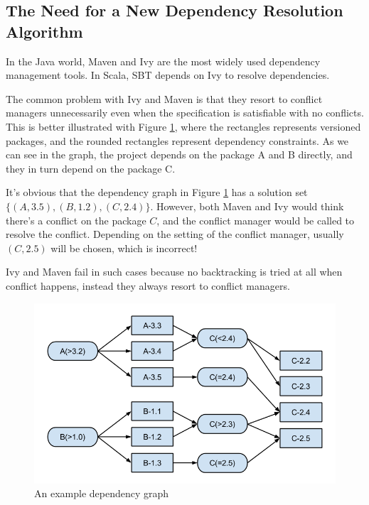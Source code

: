 \subsection{The Need for a New Dependency Resolution Algorithm}

In the Java world, Maven and Ivy are the most widely used dependency management tools. In Scala, SBT depends on Ivy to resolve dependencies.

The common problem with Ivy and Maven is that they resort to conflict managers unnecessarily even when the specification is satisfiable with no conflicts. This is better illustrated with Figure \ref{fig:introuction:underconstraint}, where the rectangles represents versioned packages, and the rounded rectangles represent dependency constraints.  As we can see in the graph, the project depends on the package A and B directly, and they in turn depend on the package C.

It's obvious that the dependency graph in Figure \ref{fig:introuction:underconstraint} has a solution set $\{(A, 3.5), (B, 1.2), (C, 2.4)\}$. However, both Maven and Ivy would think there's a conflict on the package $C$, and the conflict manager would be called to resolve the conflict. Depending on the setting of the conflict manager, usually $(C, 2.5)$ will be chosen, which is incorrect!

Ivy and Maven fail in such cases because no backtracking is tried at all when conflict happens, instead they always resort to conflict managers.

\begin{figure}[ht]
  \center
  \includegraphics[width=14cm]{img/introduction/underconstraint.png}
  \caption[An example dependency graph]{An example dependency graph \label{fig:introuction:underconstraint}}
\end{figure}

